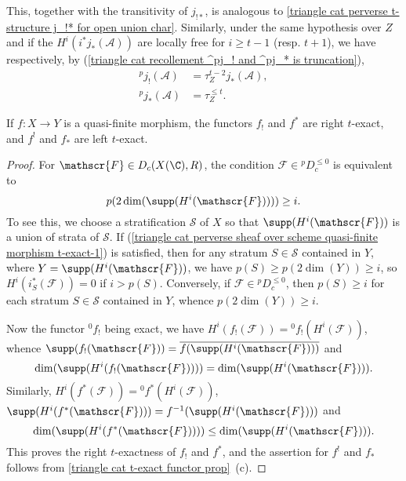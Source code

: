 This, together with the transitivity of $j_{!*}$, is analogous to \cref{triangle cat perverse t-structure j_!* for open union char}. Similarly, under the same hypothesis over $Z$ and if the $H^i(i^*j_*(\mathscr{A}))$ are locally free for $i\geq t-1$ (resp. $t+1$), we have respectively, by (\cref{triangle cat recollement ^pj_! and ^pj_* is truncation}),
\begin{align}
{^pj_!}(\mathscr{A})&=\tau^{t-2}_Zj_*(\mathscr{A}),\label{triangle cat perverse sheaf over scheme ^pj_! char}\\
{^pj_*}(\mathscr{A})&=\tau^{\leq t}_Z.\label{triangle cat perverse sheaf over scheme ^pj_* char}
\end{align}

\begin{proposition}\label{triangle cat perverse sheaf over scheme quasi-finite morphism t-exact}
If $f:X\to Y$ is a quasi-finite morphism, the functors $f_!$ and $f^*$ are right $t$-exact, and $f^!$ and $f_*$ are left $t$-exact.
\end{proposition}
\begin{proof}
For $\mathscr{F}\in D_c(X(\C),R)$, the condition $\mathscr{F}\in {^pD_c^{\leq 0}}$ is equivalent to
\begin{equation}\label{triangle cat perverse sheaf over scheme quasi-finite morphism t-exact-1}
p(2\dim(\supp(H^i(\mathscr{F}))))\geq i.
\end{equation}
To see this, we choose a stratification $\mathcal{S}$ of $X$ so that $\supp(H^i(\mathscr{F}))$ is a union of strata of $\mathcal{S}$. If (\ref{triangle cat perverse sheaf over scheme quasi-finite morphism t-exact-1}) is satisfied, then for any stratum $S\in\mathcal{S}$ contained in $Y$, where $Y=\supp(H^i(\mathscr{F}))$, we have $p(S)\geq p(2\dim(Y))\geq i$, so $H^i(i_S^*(\mathscr{F}))=0$ if $i>p(S)$. Conversely, if $\mathscr{F}\in {^pD_c^{\leq 0}}$, then $p(S)\geq i$ for each stratum $S\in\mathcal{S}$ contained in $Y$, whence $p(2\dim(Y))\geq i$.\par
Now the functor ${^0f_!}$ being exact, we have $H^i(f_!(\mathscr{F}))={^0f_!}(H^i(\mathscr{F}))$, whence $\supp(f_!(\mathscr{F}))=\overline{f(\supp(H^i(\mathscr{F})))}$ and
\[\dim(\supp(H^i(f_!(\mathscr{F}))))=\dim(\supp(H^i(\mathscr{F}))).\] Similarly, $H^i(f^*(\mathscr{F}))={^0f^*}(H^i(\mathscr{F}))$, $\supp(H^i(f^*(\mathscr{F})))=f^{-1}(\supp(H^i(\mathscr{F})))$ and
\[\dim(\supp(H^i(f^*(\mathscr{F}))))\leq\dim(\supp(H^i(\mathscr{F}))).\] This proves the right $t$-exactness of $f_!$ and $f^*$, and the assertion for $f^!$ and $f_*$ follows from \cref{triangle cat t-exact functor prop}~(c).
\end{proof}

